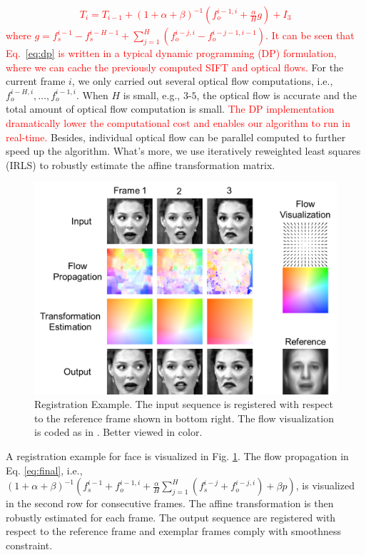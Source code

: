 \documentclass[10pt,journal]{IEEEtran}
\newcommand{\Songfan}[1]{\textcolor{red}{#1}}
\begin{document}
\Songfan{
\begin{align}
\label{eq:dp}
T_i=T_{i-1}+(1+\alpha+\beta)^{-1}(f_o^{i-1,i}+\frac{\alpha}{H}g) + I_3
\end{align}
}
\noindent \Songfan{where $g=f_s^{i-1}-f_s^{i-H-1}+\sum_{j=1}^H(f_o^{i-j,i}-f_o^{i-j-1,i-1})$. It can be seen that Eq.~\ref{eq:dp} is written in a typical dynamic programming (DP) formulation, where we can cache the previously computed SIFT and optical flows.} For the current frame $i$, we only carried out several optical flow computations, i.e., $f_o^{i-H,i},\ldots,f_o^{i-1,i}$. When $H$ is small, e.g., $3$-$5$, the optical flow is accurate and the total amount of optical flow computation is small. \Songfan{The DP implementation dramatically lower the computational cost and enables our algorithm to run in real-time.} Besides, individual optical flow can be parallel computed to further speed up the algorithm. What's more, we use iteratively reweighted least squares (IRLS) \cite{Huber81} to robustly estimate the affine transformation matrix. 

\begin{figure}[htbp]
	\centering
		\includegraphics[width=\columnwidth]{fig/theory_example.png}
	\caption{Registration Example. The input sequence is registered with respect to the reference frame shown in bottom right. The flow visualization is coded as in \cite{Baker_ICCV07}. Better viewed in color.}
	\label{fig_theory_example}
\end{figure}

A registration example for face is visualized in Fig. \ref{fig_theory_example}. The flow propagation in Eq. \ref{eq:final}, i.e., $(1+\alpha+\beta)^{-1}(f_s^{i-1}+f_o^{i-1,i}+\frac{\alpha}{H}\sum_{j=1}^H(f_s^{i-j}+f_o^{i-j,i})+\beta{p})$, is visualized in the second row for consecutive frames. The affine transformation is then robustly estimated for each frame. The output sequence are registered with respect to the reference frame and exemplar frames comply with smoothness constraint. 
\end{document}
